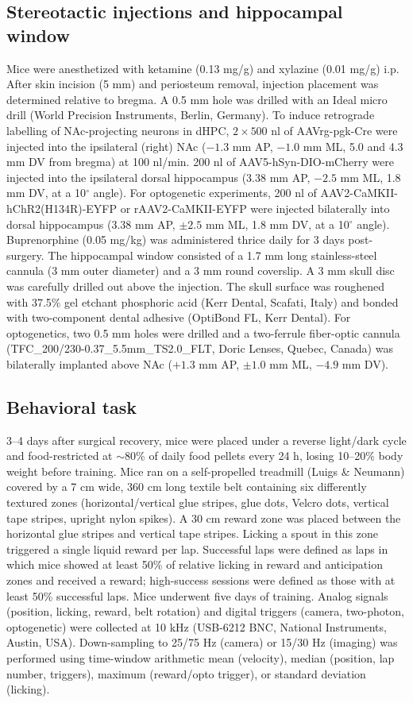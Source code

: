 \documentclass[10pt,a4paper]{article}
\begin{document}
\subsection{Stereotactic injections and hippocampal window}
Mice were anesthetized with ketamine (0.13 mg/g) and xylazine (0.01 mg/g) i.p. After skin incision (5 mm) and periosteum removal, injection placement was determined relative to bregma. A 0.5 mm hole was drilled with an Ideal micro drill (World Precision Instruments, Berlin, Germany). To induce retrograde labelling of NAc-projecting neurons in dHPC, $2\times500$ nl of AAVrg-pgk-Cre were injected into the ipsilateral (right) NAc ($-1.3$ mm AP, $-1.0$ mm ML, 5.0 and 4.3 mm DV from bregma) at 100 nl/min. 200 nl of AAV5-hSyn-DIO-mCherry were injected into the ipsilateral dorsal hippocampus (3.38 mm AP, $-2.5$ mm ML, 1.8 mm DV, at a 10$^{\circ}$ angle). For optogenetic experiments, 200 nl of AAV2-CaMKII-hChR2(H134R)-EYFP or rAAV2-CaMKII-EYFP were injected bilaterally into dorsal hippocampus (3.38 mm AP, $\pm 2.5$ mm ML, 1.8 mm DV, at a 10$^{\circ}$ angle). Buprenorphine (0.05 mg/kg) was administered thrice daily for 3 days post-surgery. The hippocampal window consisted of a 1.7 mm long stainless-steel cannula (3 mm outer diameter) and a 3 mm round coverslip. A 3 mm skull disc was carefully drilled out above the injection. The skull surface was roughened with 37.5\% gel etchant phosphoric acid (Kerr Dental, Scafati, Italy) and bonded with two-component dental adhesive (OptiBond FL, Kerr Dental). For optogenetics, two 0.5 mm holes were drilled and a two-ferrule fiber-optic cannula (TFC\_200/230-0.37\_5.5mm\_TS2.0\_FLT, Doric Lenses, Quebec, Canada) was bilaterally implanted above NAc ($+1.3$ mm AP, $\pm 1.0$ mm ML, $-4.9$ mm DV).

\subsection{Behavioral task}
3--4 days after surgical recovery, mice were placed under a reverse light/dark cycle and food-restricted at $\sim$80\% of daily food pellets every 24 h, losing 10--20\% body weight before training. Mice ran on a self-propelled treadmill (Luigs \& Neumann) covered by a 7 cm wide, 360 cm long textile belt containing six differently textured zones (horizontal/vertical glue stripes, glue dots, Velcro dots, vertical tape stripes, upright nylon spikes). A 30 cm reward zone was placed between the horizontal glue stripes and vertical tape stripes. Licking a spout in this zone triggered a single liquid reward per lap. Successful laps were defined as laps in which mice showed at least 50\% of relative licking in reward and anticipation zones and received a reward; high-success sessions were defined as those with at least 50\% successful laps. Mice underwent five days of training. Analog signals (position, licking, reward, belt rotation) and digital triggers (camera, two-photon, optogenetic) were collected at 10 kHz (USB-6212 BNC, National Instruments, Austin, USA). Down-sampling to 25/75 Hz (camera) or 15/30 Hz (imaging) was performed using time-window arithmetic mean (velocity), median (position, lap number, triggers), maximum (reward/opto trigger), or standard deviation (licking).
\end{document}
